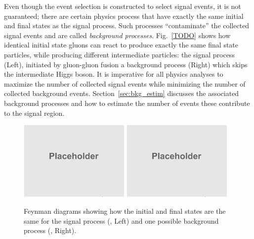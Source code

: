 Even though the event selection is constructed to select signal events, it is not guaranteed;
there are certain physics process that have exactly the same initial and final states as the signal process.
Such processes ``contaminate'' the collected signal events and are called \emph{background processes}.
Fig.~\ref{TODO} shows how identical initial state gluons can react to produce exactly the same final state particles, while producing different intermediate particles:
the signal process (Left), initiated by gluon-gluon fusion \vs a background process (Right) which skips the intermediate Higgs boson.
It is imperative for all physics analyses to maximize the number of collected signal events while minimizing the number of collected background events.
Section~\ref{sec:bkg_estim} discusses the associated background processes and how to estimate the number of events these contribute to the signal region.
\begin{figure}[!htbp]
	\begin{center}
		\includegraphics[width=0.48\textwidth]{figures/placeholder.png}  %
		\includegraphics[width=0.48\textwidth]{figures/placeholder.png}  %
		\caption{
            Feynman diagrams showing how the initial and final states are the same
            for the signal process (\gghzzfourl, Left) and one possible background process (\ggzzfourl, Right).
        }
		\label{fig:feyndiag_sig_vs_bkg}
	\end{center}
\end{figure}

